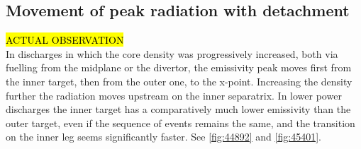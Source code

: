 \subsection{Movement of peak radiation with detachment}
\hl{ACTUAL OBSERVATION}\\
In discharges in which the core density was progressively increased, both via fuelling from the midplane or the divertor, the emissivity peak moves first from the inner target, then from the outer one, to the x-point. Increasing the density further the radiation moves upstream on the inner separatrix.
In lower power discharges the inner target has a comparatively much lower emissivity than the outer target, even if the sequence of events remains the same, and the transition on the inner leg seems significantly faster.
See \autoref{fig:44892} and \autoref{fig:45401}.

